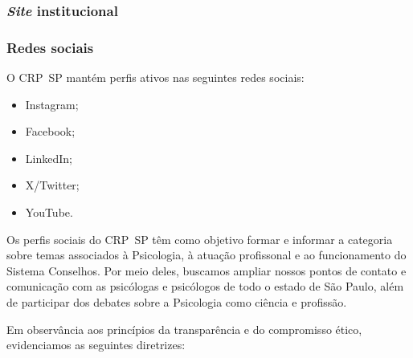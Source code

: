 \subsubsection{\emph{Site} institucional}

\subsubsection{Redes sociais}

O CRP~SP mantém perfis ativos nas seguintes redes sociais:

\begin{itemize}
	\item
	Instagram;
	\item
	Facebook;
	\item
	LinkedIn;
	\item
	X/Twitter;
	\item
	YouTube.
\end{itemize}

Os perfis sociais do CRP~SP têm como objetivo formar e informar a categoria sobre temas associados à Psicologia, à atuação profissonal e ao funcionamento do Sistema Conselhos. Por meio deles, buscamos ampliar nossos pontos de contato e comunicação com as psicólogas e psicólogos de todo o estado de São Paulo, além de participar dos debates sobre a
Psicologia como ciência e profissão.

Em observância aos princípios da transparência e do compromisso ético, evidenciamos as seguintes diretrizes:

